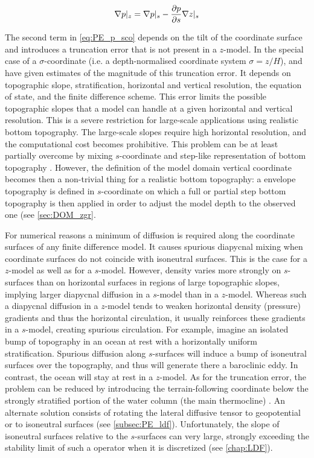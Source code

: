 \documentclass[../main/NEMO_manual]{subfiles}
\begin{document}
\begin{equation}
  \label{eq:PE_p_sco}
  \nabla p |_z = \nabla p |_s - \pd[p]{s} \nabla z |_s
\end{equation}

The second term in \autoref{eq:PE_p_sco} depends on the tilt of the coordinate surface and
introduces a truncation error that is not present in a $z$-model.
In the special case of a $\sigma$-coordinate (i.e. a depth-normalised coordinate system $\sigma = z/H$),
\citet{Haney1991} and \citet{Beckmann1993} have given estimates of the magnitude of this truncation error.
It depends on topographic slope, stratification, horizontal and vertical resolution, the equation of state,
and the finite difference scheme.
This error limits the possible topographic slopes that a model can handle at
a given horizontal and vertical resolution.
This is a severe restriction for large-scale applications using realistic bottom topography.
The large-scale slopes require high horizontal resolution, and the computational cost becomes prohibitive.
This problem can be at least partially overcome by mixing $s$-coordinate and
step-like representation of bottom topography \citep{Gerdes1993a,Gerdes1993b,Madec_al_JPO96}.
However, the definition of the model domain vertical coordinate becomes then a non-trivial thing for
a realistic bottom topography:
a envelope topography is defined in $s$-coordinate on which a full or
partial step bottom topography is then applied in order to adjust the model depth to the observed one
(see \autoref{sec:DOM_zgr}.

For numerical reasons a minimum of diffusion is required along the coordinate surfaces of
any finite difference model.
It causes spurious diapycnal mixing when coordinate surfaces do not coincide with isoneutral surfaces.
This is the case for a $z$-model as well as for a $s$-model.
However, density varies more strongly on $s$-surfaces than on horizontal surfaces in regions of
large topographic slopes, implying larger diapycnal diffusion in a $s$-model than in a $z$-model.
Whereas such a diapycnal diffusion in a $z$-model tends to weaken horizontal density (pressure) gradients and thus
the horizontal circulation, it usually reinforces these gradients in a $s$-model, creating spurious circulation.
For example, imagine an isolated bump of topography in an ocean at rest with a horizontally uniform stratification.
Spurious diffusion along $s$-surfaces will induce a bump of isoneutral surfaces over the topography,
and thus will generate there a baroclinic eddy.
In contrast, the ocean will stay at rest in a $z$-model.
As for the truncation error, the problem can be reduced by introducing the terrain-following coordinate below
the strongly stratified portion of the water column (\ie the main thermocline) \citep{Madec_al_JPO96}.
An alternate solution consists of rotating the lateral diffusive tensor to geopotential or to isoneutral surfaces
(see \autoref{subsec:PE_ldf}).
Unfortunately, the slope of isoneutral surfaces relative to the $s$-surfaces can very large,
strongly exceeding the stability limit of such a operator when it is discretized (see \autoref{chap:LDF}).
\end{document}
